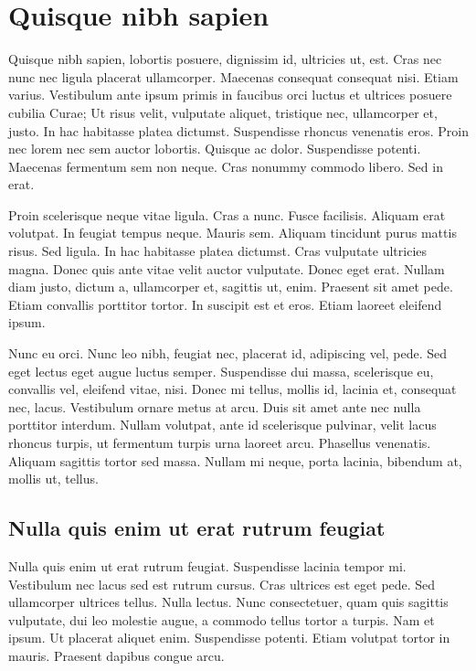 \documentclass[eng,printmode]{mgr}
\begin{document}
\chapter{Quisque nibh sapien}
Quisque nibh sapien, lobortis posuere, dignissim id, ultricies ut, est. Cras nec nunc nec ligula placerat ullamcorper. Maecenas consequat consequat nisi. Etiam varius. Vestibulum ante ipsum primis in faucibus orci luctus et ultrices posuere cubilia Curae; Ut risus velit, vulputate aliquet, tristique nec, ullamcorper et, justo. In hac habitasse platea dictumst. Suspendisse rhoncus venenatis eros. Proin nec lorem nec sem auctor lobortis. Quisque ac dolor. Suspendisse potenti. Maecenas fermentum sem non neque. Cras nonummy commodo libero. Sed in erat. 

Proin scelerisque neque vitae ligula. Cras a nunc. Fusce facilisis. Aliquam erat volutpat. In feugiat tempus neque. Mauris sem. Aliquam tincidunt purus mattis risus. Sed ligula. In hac habitasse platea dictumst. Cras vulputate ultricies magna. Donec quis ante vitae velit auctor vulputate. Donec eget erat. Nullam diam justo, dictum a, ullamcorper et, sagittis ut, enim. Praesent sit amet pede. Etiam convallis porttitor tortor. In suscipit est et eros. Etiam laoreet eleifend ipsum. 

Nunc eu orci. Nunc leo nibh, feugiat nec, placerat id, adipiscing vel, pede. Sed eget lectus eget augue luctus semper. Suspendisse dui massa, scelerisque eu, convallis vel, eleifend vitae, nisi. Donec mi tellus, mollis id, lacinia et, consequat nec, lacus. Vestibulum ornare metus at arcu. Duis sit amet ante nec nulla porttitor interdum. Nullam volutpat, ante id scelerisque pulvinar, velit lacus rhoncus turpis, ut fermentum turpis urna laoreet arcu. Phasellus venenatis. Aliquam sagittis tortor sed massa. Nullam mi neque, porta lacinia, bibendum at, mollis ut, tellus. 

\section{Nulla quis enim ut erat rutrum feugiat}
Nulla quis enim ut erat rutrum feugiat. Suspendisse lacinia tempor mi. Vestibulum nec lacus sed est rutrum cursus. Cras ultrices est eget pede. Sed ullamcorper ultrices tellus. Nulla lectus. Nunc consectetuer, quam quis sagittis vulputate, dui leo molestie augue, a commodo tellus tortor a turpis. Nam et ipsum. Ut placerat aliquet enim. Suspendisse potenti. Etiam volutpat tortor in mauris. Praesent dapibus congue arcu. 
\end{document}
